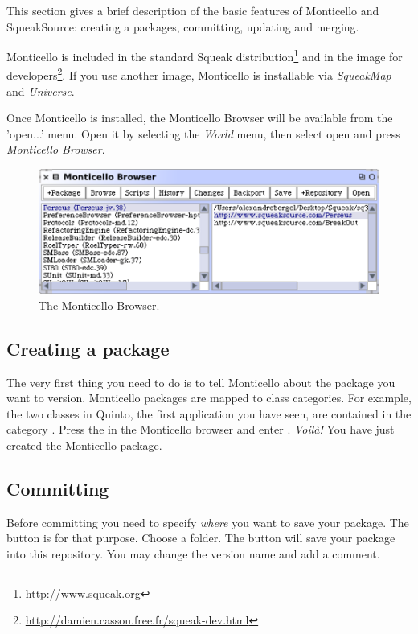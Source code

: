 \documentclass[a4paper,10pt,twoside]{book}
\begin{document}
This section gives a brief description of the basic features of Monticello and SqueakSource: creating a packages, committing, updating and merging.

Monticello is included in the standard Squeak distribution\footnote{\url{http://www.squeak.org}} and in the image for developers\footnote{\url{http://damien.cassou.free.fr/squeak-dev.html}}. If you use another image, Monticello is installable via \emph{SqueakMap} and \emph{Universe}.

Once Monticello is installed, the Monticello Browser will be available from the 'open...' menu. Open it by selecting the \emph{World} menu, then select open and press \emph{Monticello Browser}.

\begin{figure}[ht]\centering
	\includegraphics[width=.75\linewidth]{monticello.png}
	\caption{The Monticello Browser.}
\end{figure}

\subsection{Creating a package}

The very first thing you need to do is to tell Monticello about the package you want to version. Monticello packages are mapped to class categories. For example, the two classes in Quinto, the first application you have seen, are contained in the category . Press the  in the Monticello browser and enter . \emph{Voil\`a!} You have just created the  Monticello package. 

\subsection{Committing}

Before committing you need to specify \emph{where} you want to save your package. The  button is for that purpose. Choose a folder. The  button will save your package into this repository. You may change the version name and add a comment. 
\end{document}
